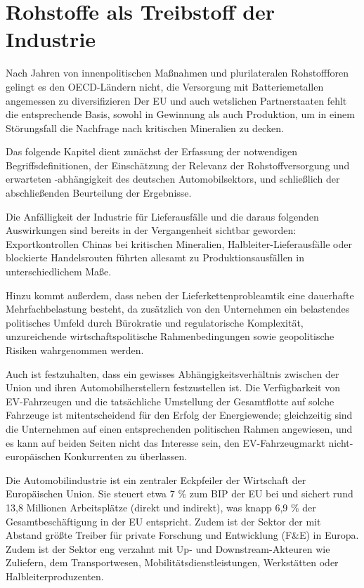 \documentclass[12pt,a4paper,oneside]{book} %
\begin{document}
	
	
	\chapter{Rohstoffe als Treibstoff der Industrie}
	
	\glqq Nach Jahren von innenpolitischen Maßnahmen und plurilateralen Rohstoffforen gelingt es den OECD-Ländern nicht, die Versorgung mit Batteriemetallen angemessen zu diversifizieren\grqq \autocite{McBrdige, S. 26} Der EU und auch wetslichen Partnerstaaten fehlt die entsprechende Basis, sowohl in Gewinnung als auch Produktion, um in einem Störungsfall die Nachfrage nach kritischen Mineralien zu decken.
	
	Das folgende Kapitel dient zunächst der Erfassung der notwendigen Begriffsdefinitionen, der Einschätzung der Relevanz der Rohstoffversorgung und erwarteten -abhängigkeit des deutschen Automobilsektors, und schließlich der abschließenden Beurteilung der Ergebnisse.
	
	Die Anfälligkeit der Industrie für Lieferausfälle und die daraus folgenden Auswirkungen sind bereits in der Vergangenheit sichtbar geworden: Exportkontrollen Chinas bei kritischen Mineralien, Halbleiter-Lieferausfälle oder blockierte Handelsrouten führten allesamt zu Produktionsausfällen in unterschiedlichem Maße.
	
	Hinzu kommt außerdem, dass neben der Lieferkettenprobleamtik eine dauerhafte Mehrfachbelastung besteht, da zusätzlich von den Unternehmen ein belastendes politisches Umfeld durch Bürokratie und regulatorische Komplexität, unzureichende wirtschaftspolitische Rahmenbedingungen sowie geopolitische Risiken wahrgenommen werden.\autocite{BME-Frühjahrsbarometer 2026, Deutsche Wirtschaft und Beschaffung unter Dauerstress}
	
	Auch ist festzuhalten, dass ein gewisses Abhängigkeitsverhältnis zwischen der Union und ihren Automobilherstellern festzustellen ist. Die Verfügbarkeit von EV-Fahrzeugen und die tatsächliche Umstellung der Gesamtflotte auf solche Fahrzeuge ist mitentscheidend für den Erfolg der Energiewende; gleichzeitig sind die Unternehmen auf einen entsprechenden politischen Rahmen angewiesen, und es kann auf beiden Seiten nicht das Interesse sein, den EV-Fahrzeugmarkt nicht-europäischen Konkurrenten zu überlassen. 
	
	Die Automobilindustrie ist ein zentraler Eckpfeiler der Wirtschaft der Europäischen Union. Sie steuert etwa 7 \% zum BIP der EU bei und sichert rund 13,8 Millionen Arbeitsplätze (direkt und indirekt), was knapp 6,9 \% der Gesamtbeschäftigung in der EU entspricht. Zudem ist der Sektor der mit Abstand größte Treiber für private Forschung und Entwicklung (F&E) in Europa.\autocite{Automotive industry, European Commission} Zudem ist der Sektor eng verzahnt mit Up- und Downstream-Akteuren wie Zuliefern, dem Transportwesen, Mobilitätsdienstleistungen, Werkstätten oder Halbleiterproduzenten.
	
\end{document}
